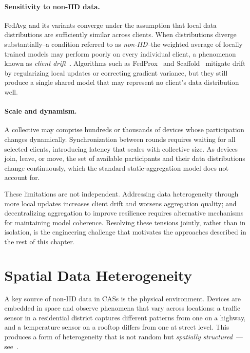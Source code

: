 \paragraph{Sensitivity to non-IID data.}
\gls{FedAvg} and its variants converge under the assumption
 that local data distributions are sufficiently similar across clients.
%
When distributions diverge substantially--a condition referred to as
 \emph{non-\gls{IID}}--the weighted average of locally trained models
 may perform poorly on every individual client,
 a phenomenon known as \emph{client drift}~\cite{DBLP:conf/icml/KarimireddyKMRS20}.
%
Algorithms such as FedProx~\cite{DBLP:conf/mlsys/LiSZSTS20} and
 Scaffold~\cite{DBLP:conf/icml/KarimireddyKMRS20} mitigate drift
 by regularizing local updates or correcting gradient variance,
 but they still produce a single shared model
 that may represent no client's data distribution well.

\paragraph{Scale and dynamism.}
A collective may comprise hundreds or thousands of devices
 whose participation changes dynamically.
%
Synchronization between rounds requires waiting for all selected clients,
 introducing latency that scales with collective size.
%
As devices join, leave, or move,
 the set of available participants and their data distributions
 change continuously, which the standard static-aggregation model does not account for.

These limitations are not independent.
%
Addressing data heterogeneity through more local updates
 increases client drift and worsens aggregation quality;
 and decentralizing aggregation to improve resilience
 requires alternative mechanisms for maintaining model coherence.
%
Resolving these tensions jointly, rather than in isolation, is the
 engineering challenge that motivates the approaches described in the rest of this chapter.

\section{Spatial Data Heterogeneity}
\label{sec:fl-heterogeneity}

A key source of non-\gls{IID} data in \glspl{CAS} is the physical environment.
%
Devices are embedded in space and observe phenomena that vary across locations:
 a traffic sensor in a residential district captures different patterns
 from one on a highway, and a temperature sensor on a rooftop differs
 from one at street level.
%
This produces a form of heterogeneity that is not random
 but \emph{spatially structured}~\cite{DBLP:journals/iot/DominiFAVE26,DBLP:journals/jors/DominiIALV26}---see~.

